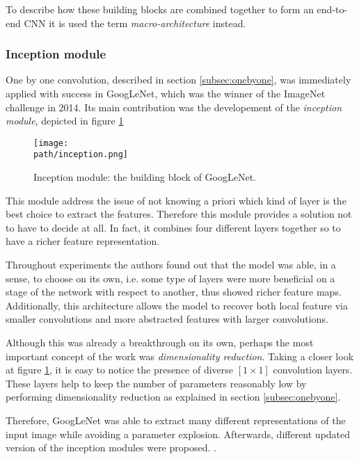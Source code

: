 To describe how these building blocks are combined together to form an end-to-end CNN it is used the term \emph{macro-architecture} instead. 


\subsubsection{Inception module}
One by one convolution, described in section \ref{subsec:onebyone}, was immediately applied with success in GoogLeNet, which was the winner of the ImageNet challenge in 2014\parencite{googlenet}. Its main contribution was the developement of the \emph{inception module}, depicted in figure \ref{fig:inception}

\begin{figure}[h!]
 \centering
 \texttt{[image: \\path/inception.png]} 
 \caption{Inception module: the building block of GoogLeNet.}
 \label{fig:inception}
\end{figure}

This module address the issue of not knowing a priori which kind of layer is the best choice to extract the features. Therefore this module provides a solution not to have to decide at all. In fact, it combines four different layers together so to have a richer feature representation. 

Throughout experiments the authors found out that the model was able, in a sense, to choose on its own, i.e. some type of layers were more beneficial on a stage of the network with respect to another, thus showed richer feature maps. Additionally, this architecture allows the model to recover both local feature via smaller convolutions and more abstracted features with larger convolutions. 
\newline 

Although this was already a breakthrough on its own, perhaps the most important concept of the work was \emph{dimensionality reduction}. Taking a closer look at figure \ref{fig:inception}, it is easy to notice the presence of diverse $[1 \times 1]$ convolution layers. These layers help to keep the number of parameters reasonably low by performing dimensionality reduction as explained in section \ref{subsec:onebyone}. 

Therefore, GoogLeNet was able to extract many different representations of the input image while avoiding a parameter explosion. Afterwards, different updated version of the inception modules were proposed. \parencite{incpetion3} \parencite{inception4}.

